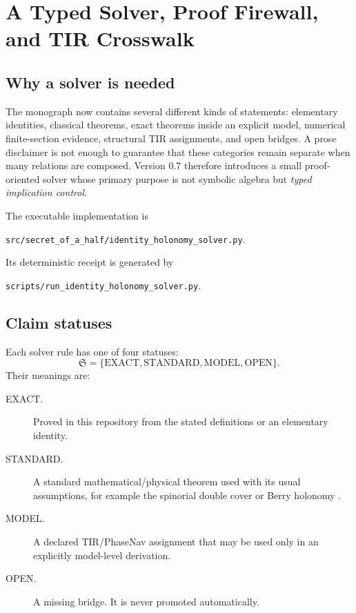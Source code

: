 \chapter{A Typed Solver, Proof Firewall, and TIR Crosswalk}
\label{chap:typed-solver}

\section{Why a solver is needed}

The monograph now contains several different kinds of statements: elementary
identities, classical theorems, exact theorems inside an explicit model,
numerical finite-section evidence, structural TIR assignments, and open bridges.
A prose disclaimer is not enough to guarantee that these categories remain
separate when many relations are composed.  Version 0.7 therefore introduces a
small proof-oriented solver whose primary purpose is not symbolic algebra but
\emph{typed implication control}.

The executable implementation is
\begin{center}
 \texttt{src/secret\_of\_a\_half/identity\_holonomy\_solver.py}.
\end{center}
Its deterministic receipt is generated by
\begin{center}
 \texttt{scripts/run\_identity\_holonomy\_solver.py}.
\end{center}

\section{Claim statuses}

Each solver rule has one of four statuses:
\begin{equation}
 \mathfrak S
 =\{\mathrm{EXACT},\mathrm{STANDARD},\mathrm{MODEL},\mathrm{OPEN}\}.
 \label{eq:solver-status-set}
\end{equation}
Their meanings are:
\begin{description}
 \item[EXACT.] Proved in this repository from the stated definitions or an
 elementary identity.
 \item[STANDARD.] A standard mathematical/physical theorem used with its usual
 assumptions, for example the spinorial double cover or Berry holonomy
 \citep{berry1984,simon1983}.
 \item[MODEL.] A declared TIR/PhaseNav assignment that may be used only in an
 explicitly model-level derivation.
 \item[OPEN.] A missing bridge.  It is never promoted automatically.
\end{description}

